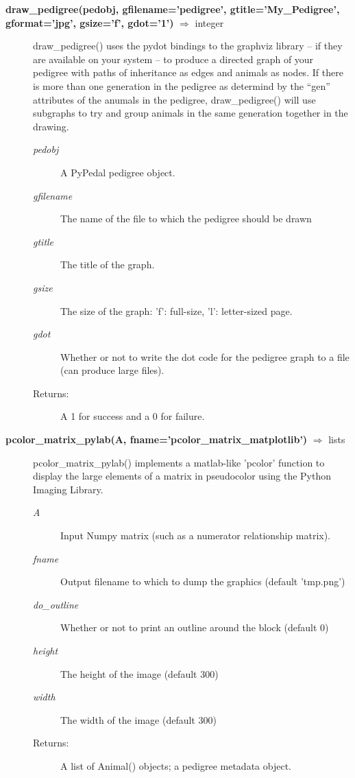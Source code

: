 \begin{description}
\item[\textbf{draw\_pedigree(pedobj, gfilename='pedigree', gtitle='My\_Pedigree', gformat='jpg', gsize='f', gdot='1')} $\Rightarrow$ integer]
draw\_pedigree() uses the pydot bindings to the graphviz library -- if they are available on your system -- to produce a directed graph of your pedigree with paths of inheritance as edges and animals as nodes. If there is more than one generation in the pedigree as determind by the ``gen'' attributes of the anumals in the pedigree, draw\_pedigree() will use subgraphs to try and group animals in the same generation together in the drawing.
\begin{description}
\item[\emph{pedobj}] A PyPedal pedigree object.
\item[\emph{gfilename}] The name of the file to which the pedigree should be drawn
\item[\emph{gtitle}] The title of the graph.
\item[\emph{gsize}] The size of the graph: 'f': full-size, 'l': letter-sized page.
\item[\emph{gdot}] Whether or not to write the dot code for the pedigree graph to a file (can produce large files).
\item[Returns:] A 1 for success and a 0 for failure.
\end{description}

\item[\textbf{pcolor\_matrix\_pylab(A, fname='pcolor\_matrix\_matplotlib')} $\Rightarrow$ lists]
pcolor\_matrix\_pylab() implements a matlab-like 'pcolor' function to display the large elements of a matrix in pseudocolor using the Python Imaging Library.
\begin{description}
\item[\emph{A}] Input Numpy matrix (such as a numerator relationship matrix).
\item[\emph{fname}] Output filename to which to dump the graphics (default 'tmp.png')
\item[\emph{do\_outline}] Whether or not to print an outline around the block (default 0)
\item[\emph{height}] The height of the image (default 300)
\item[\emph{width}] The width of the image (default 300)
\item[Returns:] A list of Animal() objects; a pedigree metadata object.
\end{description}


\end{description}
